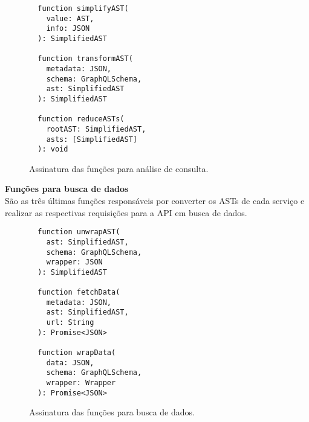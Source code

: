 \begin{figure}[H]
  \centering
  \begin{verbatim}
  function simplifyAST(
    value: AST, 
    info: JSON
  ): SimplifiedAST

  function transformAST(
    metadata: JSON,
    schema: GraphQLSchema, 
    ast: SimplifiedAST
  ): SimplifiedAST

  function reduceASTs(
    rootAST: SimplifiedAST, 
    asts: [SimplifiedAST]
  ): void
  \end{verbatim}
  \caption{Assinatura das funções para análise de consulta.}
\end{figure}

\textbf{Funções para busca de dados} \\

São as três últimas funções responsáveis por converter os ASTs de cada serviço e realizar as respectivas requisições para a API em busca de dados.

\begin{figure}[H]
  \centering
  \begin{verbatim}
  function unwrapAST(
    ast: SimplifiedAST, 
    schema: GraphQLSchema, 
    wrapper: JSON
  ): SimplifiedAST

  function fetchData(
    metadata: JSON, 
    ast: SimplifiedAST, 
    url: String
  ): Promise<JSON>

  function wrapData(
    data: JSON, 
    schema: GraphQLSchema, 
    wrapper: Wrapper
  ): Promise<JSON>
  \end{verbatim}
  \caption{Assinatura das funções para busca de dados.}
\end{figure}
